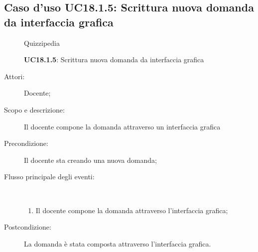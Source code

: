 \subsection{Caso d'uso UC18.1.5: Scrittura nuova domanda da interfaccia grafica}
	\begin{figure}[H]
		\centering
		\begin{resizedtikzpicture}{\textwidth}
		\begin{umlsystem}[x=0, fill=lightgray!20]{Quizzipedia}
		\end{umlsystem}
		\end{resizedtikzpicture}
		\caption{\textbf{UC18.1.5}: Scrittura nuova domanda da interfaccia grafica}
		\label{UC18.1.5}
	\end{figure}
\begin{description}
\item[Attori:] Docente;
\item[Scopo e descrizione:] Il docente compone la domanda attraverso un interfaccia grafica
      \item[Precondizione:] Il docente sta creando una nuova domanda;

        \item[Flusso principale degli eventi:] \ 
 \begin{enumerate}
          \item Il docente compone la domanda attraverso l'interfaccia grafica;

      \end{enumerate}
    \item[Postcondizione:] La domanda è stata composta attraverso l'interfaccia grafica.
  \end{description}
\hypertarget{UC18.2}{}
